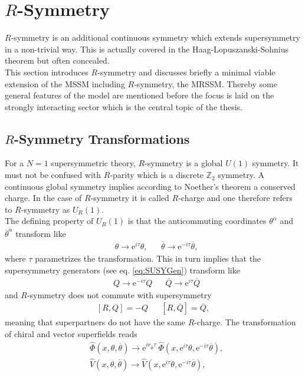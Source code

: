 \section{$R$-Symmetry}
$R$-symmetry is an additional continuous symmetry which extends  supersymmetry in a non-trivial way. This is actually covered in the Haag-Lopuszanski-Sohnius theorem \cite{Haag:1974qh} but often concealed.\\
This section introduces $R$-symmetry and discusses briefly a minimal viable extension of the MSSM including $R$-symmetry, the MRSSM. Thereby some general features of the model are mentioned before the focus is laid on the strongly interacting sector which is the central topic of the thesis. 


\subsection{$R$-Symmetry Transformations}
For a $N=1$ supersymmetric theory, $R$-symmetry is a global $U(1)$ symmetry. It must not be confused with $R$-parity which is a discrete $\mathbb{Z}_2$ symmetry. A continuous global symmetry implies according to Noether's theorem a conserved charge. In the case of $R$-symmetry it is called $R$-charge and one therefore refers to $R$-symmetry as $U_R(1)$.\\
The defining property of $U_R(1)$ is that the anticommuting coordinates $\theta^\alpha$ and $\overline{\theta}^{\dot{\alpha}}$ transform like
\begin{align}
&\theta \to \mathrm{e}^{i\tau}\theta, && \overline{\theta} \to \mathrm{e}^{-i\tau}\overline{\theta},
\end{align}
where $\tau$ parametrizes the transformation. This in turn implies that the supersymmetry generators (see eq. \eqref{eq:SUSYGen}) transform like
\begin{align}
& Q \to \mathrm{e}^{-i\tau} Q && \overline{Q} \to \mathrm{e}^{i\tau}\overline{Q}
\end{align}
and $R$-symmetry does not commute with supersymmetry 
\begin{align}
\left[ R,Q \right] = -Q && \left[ R,\overline{Q} \right] = \overline{Q},
\end{align}
meaning that superpartners do not have the same $R$-charge. The transformation of chiral and vector superfields reads
\begin{align}
& \hat{\Phi}(x,\theta,\overline{\theta}) \to \mathrm{e}^{ir_{\hat{\Phi}}\tau}\ \hat{\Phi}(x,\mathrm{e}^{i\tau}\theta,\mathrm{e}^{-i\tau}\overline{\theta}),\nonumber\\
&\hat{V}(x,\theta,\overline{\theta}) \to  \hat{V}(x,\mathrm{e}^{i\tau}\theta,\mathrm{e}^{-i\tau}\overline{\theta}),
\end{align}
